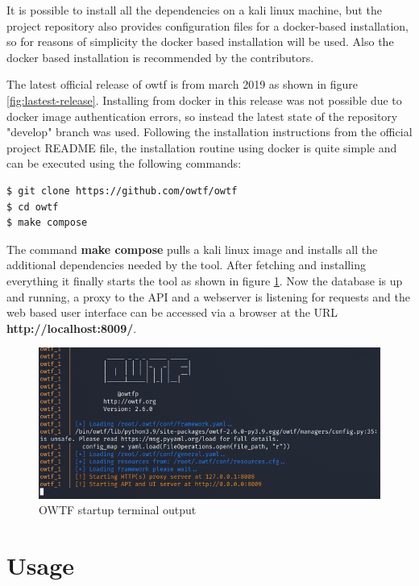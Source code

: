 It is possible to install all the dependencies on a kali linux machine, but the project repository also provides configuration files for a docker-based installation, so for reasons of simplicity the docker based installation will be used. Also the docker based installation is recommended by the contributors.

The latest official release of \ac{owtf} is from march 2019 as shown in figure \ref{fig:lastest-release}. Installing from docker in this release was not possible due to docker image authentication errors, so instead the latest state of the repository "develop" branch was used. Following the installation instructions from the official project README file, the installation routine using docker is quite simple and can be executed using the following commands:

\begin{lstlisting}
$ git clone https://github.com/owtf/owtf
$ cd owtf
$ make compose
\end{lstlisting}

The command \textbf{make compose} pulls a kali linux image and installs all the additional dependencies needed by the tool. After fetching and installing everything it finally starts the tool as shown in figure \ref{fig:docker-output}. Now the database is up and running, a proxy to the API and a webserver is listening for requests and the web based user interface can be accessed via a browser at the URL \textbf{http://localhost:8009/}.

\begin{figure}[H]
	\centering
	\includegraphics[width=12cm,keepaspectratio=true]{pictures/docker-output.png}
	\caption{
		OWTF startup terminal output
	}
	\label{fig:docker-output}
\end{figure}

\section{Usage}

